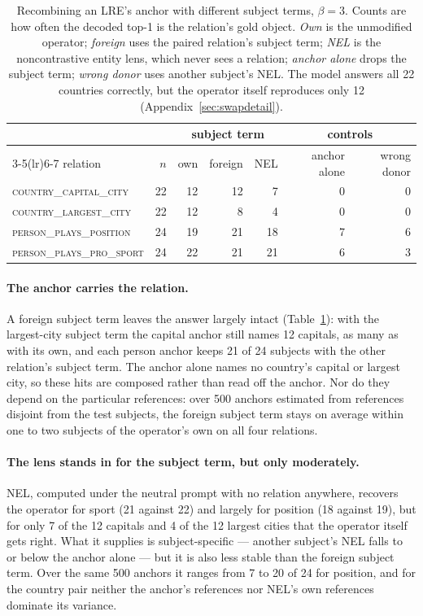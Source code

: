 \begin{table}[t]
\centering
\small
\begin{tabular}{lrrrrrr}
\toprule
& & \multicolumn{3}{c}{subject term} & \multicolumn{2}{c}{controls} \\
\cmidrule(lr){3-5}\cmidrule(lr){6-7}
relation & $n$ & own & foreign & NEL & anchor alone & wrong donor \\
\midrule
\textsc{country\_capital\_city} & 22 & 12 & 12 & 7 & 0 & 0 \\
\textsc{country\_largest\_city} & 22 & 12 & 8 & 4 & 0 & 0 \\
\textsc{person\_plays\_position} & 24 & 19 & 21 & 18 & 7 & 6 \\
\textsc{person\_plays\_pro\_sport} & 24 & 22 & 21 & 21 & 6 & 3 \\
\bottomrule
\end{tabular}
\caption{Recombining an LRE's anchor with different subject terms,
$\beta = 3$. Counts are how often the decoded top-1 is the relation's
gold object. \emph{Own} is the unmodified operator; \emph{foreign} uses
the paired relation's subject term; \emph{NEL} is the noncontrastive
entity lens, which never sees a relation; \emph{anchor alone} drops the
subject term; \emph{wrong donor} uses another subject's NEL. The model
answers all 22 countries correctly, but the operator itself reproduces
only 12 (Appendix~\ref{sec:swapdetail}).}
\label{tab:swap}
\end{table}

\paragraph{The anchor carries the relation.} A foreign subject term
leaves the answer largely intact (Table~\ref{tab:swap}): with the
largest-city subject term the capital anchor still names 12 capitals, as
many as with its own, and each person anchor keeps 21 of 24 subjects with
the other relation's subject term. The anchor alone names no country's
capital or largest city, so these hits are composed rather than read off
the anchor. Nor do they depend on the particular references: over 500
anchors estimated from references disjoint from the test subjects, the
foreign subject term stays on average within one to two subjects of the
operator's own on all four relations.

\paragraph{The lens stands in for the subject term, but only
moderately.} NEL, computed under the neutral prompt with no relation
anywhere, recovers the operator for sport (21 against 22) and largely for
position (18 against 19), but for only 7 of the 12 capitals and 4 of the
12 largest cities that the operator itself gets right. What it supplies
is subject-specific --- another subject's NEL falls to or below the
anchor alone --- but it is also less stable than the foreign subject
term. Over the same 500 anchors it ranges from 7 to 20 of 24 for
position, and for the country pair neither the anchor's references nor
NEL's own references dominate its variance.
